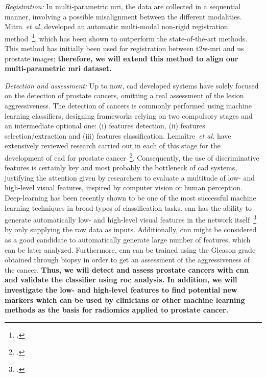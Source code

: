 \emph{Registration:}
In multi-parametric \ac{mri}, the data are collected in a sequential manner, involving a possible misalignment between the different modalities.
Mitra~\emph{et al.} developed an automatic multi-modal non-rigid registration method~\footcite{Mitra2012a}, which has been shown to outperform the state-of-the-art methods.
This method has initially been used for registration between \ac{t2w}-\ac{mri} and \ac{us} prostate images; \textbf{therefore, we will extend this method to align our multi-parametric \ac{mri} dataset.}

\emph{Detection and assessment:}
Up to now, \ac{cad} developed systems have solely focused on the detection of prostate cancers, omitting a real assessment of the lesion aggressiveness.
The detection of cancers is commonly performed using machine learning classifiers, designing frameworks relying on two compulsory stages and an intermediate optional one: (i) features detection, (ii) features selection/extraction and (iii) features classification.
Lema\^itre~\emph{et al.} have extensively reviewed research carried out in each of this stage for the development of \ac{cad} for prostate cancer~\footcite{Lemaitre2015}.
Consequently, the use of discriminative features is certainly key and most probably the bottleneck of \ac{cad} systems, justifying the attention given by researchers to evaluate a multitude of low- and high-level visual features, inspired by computer vision or human perception.
Deep-learning has been recently shown to be one of the most successful machine learning techniques in broad types of classification tasks.
\ac{cnn} has the ability to generate automatically low- and high-level visual features in the network itself~\footcite{Zeiler2013} by only supplying the raw data as inputs.
Additionally, \ac{cnn} might be considered as a good candidate to automatically generate large number of features, which can be later analyzed.
Furthermore, \ac{cnn} can be trained using the Gleason grade obtained through biopsy in order to get an assessment of the aggressiveness of the cancer.
\textbf{Thus, we will detect and assess prostate cancers with \ac{cnn} and validate the classifier using \ac{roc} analysis.
  In addition, we will investigate the low- and high-level features to find potential new markers which can be used by clinicians or other machine learning methods as the basis for radiomics applied to prostate cancer.}

